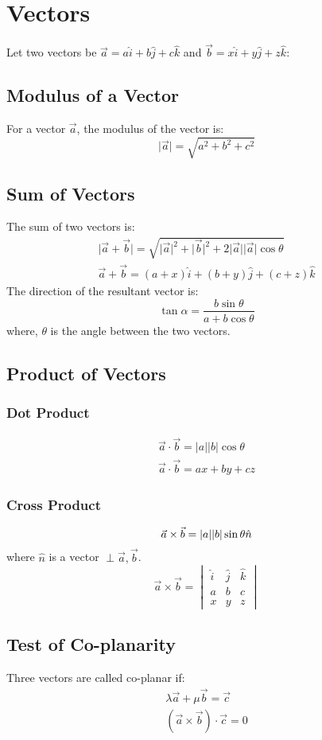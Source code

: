 \large{\chapter{Vectors}}
Let two vectors be $\vec{a}=a\hat{i}+b\hat{j}+c\hat{k}$ and $\vec{b}=x\hat{i}+y\hat{j}+z\hat{k}$:
\section{Modulus of a Vector}
For a vector $\vec{a}$, the modulus of the vector is:
\begin{equation}
	\lvert \vec{a} \rvert = \sqrt{a^2+b^2+c^2}
\end{equation}

\section{Sum of Vectors}
The sum of two vectors is:
\begin{align}
	\lvert \vec{a}+\vec{b} \rvert=\sqrt{\lvert \vec{a} \rvert^2+\lvert \vec{b} \rvert^2+2\lvert \vec{a} \rvert \lvert \vec{a} \rvert\cos \theta}\\
	\vec{a}+\vec{b}=(a+x)\hat{i}+(b+y)\hat{j}+(c+z)\hat{k}
\end{align}
The direction of the resultant vector is:
\begin{equation}
	\tan \alpha=\dfrac{b\sin\theta}{a+b\cos\theta}
\end{equation}
where, $\theta$ is the angle between the two vectors.

\section{Product of Vectors}
\subsection{Dot Product}
\begin{align}
	\vec{a}\cdot\vec{b}=\lvert a \rvert \lvert b \rvert\cos\theta\\
	\vec{a}\cdot\vec{b}=ax+by+cz
\end{align}

\subsection{Cross Product}
\begin{equation}
	\vec{a}\times\vec{b}=\lvert a \rvert \lvert b \rvert \sin\theta \hat{n}\\
\end{equation}
where $\hat{n}$ is a vector $\perp\vec{a},\vec{b}$.
\begin{equation}
	\vec{a}\times\vec{b}=\begin{vmatrix}
		\hat{i}&\hat{j}&\hat{k}\\
		a&b&c\\
		x&y&z
	\end{vmatrix}
\end{equation}

\section{Test of Co-planarity}
Three vectors are called co-planar if:
\begin{align}
	\lambda\vec{a}+\mu\vec{b}=\vec{c}\\
	(\vec{a}\times\vec{b})\cdot\vec{c}=0
\end{align}
